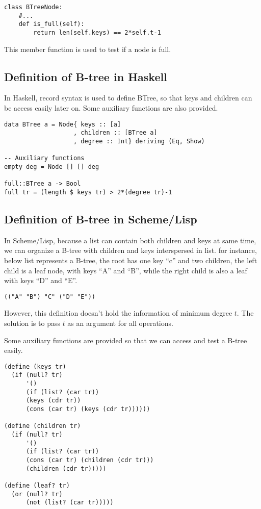 \documentclass{article}
\begin{document}
\begin{lstlisting}
class BTreeNode:
    #...
    def is_full(self):
        return len(self.keys) == 2*self.t-1
\end{lstlisting}

This member function is used to test if a node is full.

\subsection*{Definition of B-tree in Haskell}
In Haskell, record syntax is used to define BTree, so that keys and children
can be access easily later on. Some auxiliary functions are also provided.

\lstset{language=Haskell}
\begin{lstlisting}
data BTree a = Node{ keys :: [a]
                   , children :: [BTree a]
                   , degree :: Int} deriving (Eq, Show)

-- Auxiliary functions
empty deg = Node [] [] deg

full::BTree a -> Bool
full tr = (length $ keys tr) > 2*(degree tr)-1
\end{lstlisting} %

\subsection*{Definition of B-tree in Scheme/Lisp}
In Scheme/Lisp, because a list can contain both children and keys at
same time, we can organize a B-tree with children and keys interspersed
in list. for instance, below list represents a B-tree, the root has one
key ``c'' and two children, the left child is a leaf node, with keys ``A''
and ``B'', while the right child is also a leaf with keys ``D'' and ``E''.

\lstset{language=lisp}
\begin{lstlisting}
(("A" "B") "C" ("D" "E"))
\end{lstlisting}

However, this definition doesn't hold the information of minimum degree $t$.
The solution is to pass $t$ as an argument for all operations.

Some auxiliary functions are provided so that we can access and test a
B-tree easily.

\begin{lstlisting}
(define (keys tr)
  (if (null? tr)
      '()
      (if (list? (car tr))
	  (keys (cdr tr))
	  (cons (car tr) (keys (cdr tr))))))

(define (children tr)
  (if (null? tr)
      '()
      (if (list? (car tr))
	  (cons (car tr) (children (cdr tr)))
	  (children (cdr tr)))))

(define (leaf? tr)
  (or (null? tr)
      (not (list? (car tr)))))
\end{lstlisting}
\end{document}
